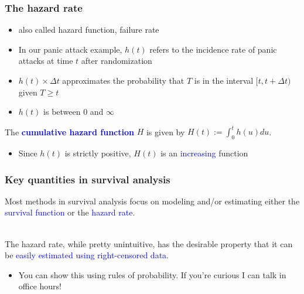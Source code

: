 \documentclass[10pt,t]{beamer}
\begin{document}
 
 \begin{frame}
 	\frametitle{The hazard rate}
 	
 	
 	
\begin{itemize}
	
\item also called hazard function, failure rate

\medskip

\item In our panic attack example, $h(t)$ refers to the incidence rate of panic attacks at time $t$ after randomization 

	
	\medskip

\item $h(t)\times \Delta t$ approximates the probability that $T$ is in the interval $[t, t + \Delta t)$ given $T \geq t$

\medskip

\item $h(t)$ is between 0 and $\infty$





\end{itemize}


\bigskip

The \textcolor{blue}{\textbf{cumulative hazard function}} $H$ is given by $H(t) := \int_0^t h(u) du$.

\medskip

\begin{itemize}
	\item Since $h(t)$ is strictly positive, $H(t)$ is an \textcolor{blue}{increasing} function
\end{itemize}

\end{frame}



\begin{frame}
\frametitle{Key quantities in survival analysis}
Most methods in survival analysis focus on modeling and/or estimating either the \textcolor{blue}{survival function} or the \textcolor{blue}{hazard rate}.
\\ ~\ 

The hazard rate, while pretty unintuitive, has the desirable property that it can be \textcolor{blue}{easily estimated using right-censored data}.

\medskip

\begin{itemize}
	\item You can show this using rules of probability. If you're curious I can talk in office hours!
\end{itemize}
\end{frame}
\end{document}
